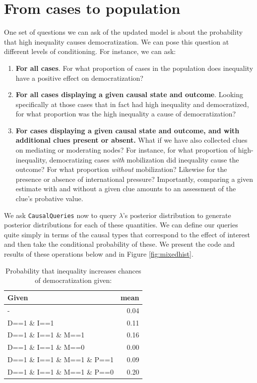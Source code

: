 \documentclass[
  12pt,
]{book}
\begin{document}
\hypertarget{from-cases-to-population}{%
\section{From cases to population}\label{from-cases-to-population}}

One set of questions we can ask of the updated model is about the probability that high inequality causes democratization. We can pose this question at different levels of conditioning. For instance, we can ask:

\begin{enumerate}
\def\labelenumi{\arabic{enumi}.}
\item
  \textbf{For all cases}. For what proportion of cases in the population does inequality have a positive effect on democratization?
\item
  \textbf{For all cases displaying a given causal state and outcome}. Looking specifically at those cases that in fact had high inequality and democratized, for what proportion was the high inequality a cause of democratization?
\item
  \textbf{For cases displaying a given causal state and outcome, and with additional clues present or absent.} What if we have also collected clues on mediating or moderating nodes? For instance, for what proportion of high-inequality, democratizing cases \emph{with} mobilization did inequality cause the outcome? For what proportion \emph{without} mobilization? Likewise for the presence or absence of international pressure? Importantly, comparing a given estimate with and without a given clue amounts to an assessment of the clue's probative value.
\end{enumerate}

We ask \texttt{CausalQueries} now to query \(\lambda\)'s posterior distribution to generate posterior distributions for each of these quantities. We can define our queries quite simply in terms of the causal types that correspond to the effect of interest and then take the conditional probability of these. We present the code and results of these operations below and in Figure \ref{fig:mixedhist}.

\begin{table}

\caption{\label{tab:unnamed-chunk-25}Probability that inequality increases chances of democratization given:}
\centering
\begin{tabular}[t]{l|r}
\hline
Given & mean\\
\hline
- & 0.04\\
\hline
D==1 \& I==1 & 0.11\\
\hline
D==1 \& I==1 \& M==1 & 0.16\\
\hline
D==1 \& I==1 \& M==0 & 0.00\\
\hline
D==1 \& I==1 \& M==1 \& P==1 & 0.09\\
\hline
D==1 \& I==1 \& M==1 \& P==0 & 0.20\\
\hline
\end{tabular}
\end{table}
\end{document}
